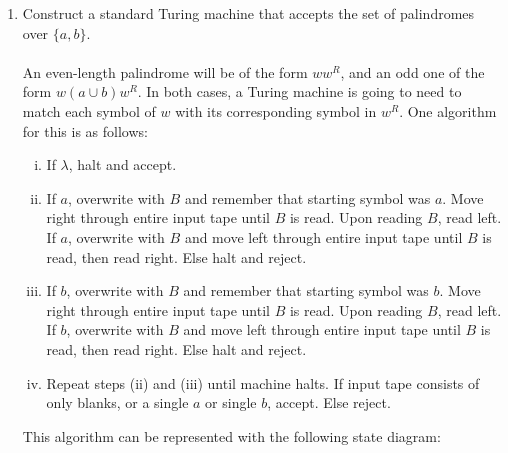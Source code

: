 \documentclass[12pt]{article}
\begin{document}
\begin{enumerate}
  \item Construct a standard Turing machine that accepts the set of palindromes over $\{a,b\}$. \\ \\
    An even-length palindrome will be of the form $ww^R$, and an odd one of the form $w(a \cup b)w^R$. In both cases, a Turing machine is going to need to match each symbol of $w$ with its corresponding symbol in $w^R$. One algorithm for this is as follows:
    \begin{enumerate}[i.]
    \item If $\lambda$, halt and accept.
    \item If $a$, overwrite with $B$ and remember that starting symbol was $a$. Move right through entire input tape until $B$ is read. Upon reading $B$, read left. If $a$, overwrite with $B$ and move left through entire input tape until $B$ is read, then read right. Else halt and reject.
    \item If $b$, overwrite with $B$ and remember that starting symbol was $b$. Move right through entire input tape until $B$ is read. Upon reading $B$, read left. If $b$, overwrite with $B$ and move left through entire input tape until $B$ is read, then read right. Else halt and reject.
    \item Repeat steps (ii) and (iii) until machine halts. If input tape consists of only blanks, or a single $a$ or single $b$, accept. Else reject.
    \end{enumerate}
This algorithm can be represented with the following state diagram:
    \begin{center}
\end{center}
\end{enumerate}
\end{document}

